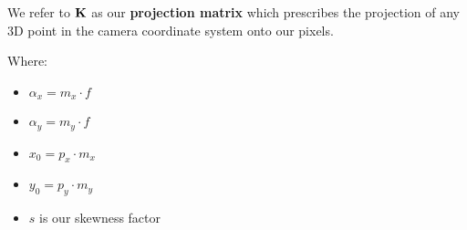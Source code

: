 \documentclass{beamer}
\begin{document}
\begin{frame}[allowframebreaks]
We refer to $\bf K$ as our \textbf{projection matrix} which prescribes the projection of any 3D point in the camera coordinate system onto our pixels.

Where:
\begin{itemize}
  \item $\alpha_{x}= m_{x} \cdot f$
  \item $\alpha_{y} = m_{y} \cdot f$
  \item $x_{0} = p_{x} \cdot m_{x}$
  \item $y_{0} = p_{y} \cdot m_{y}$
  \item $s$ is our skewness factor
\end{itemize}



  \end{frame}
\end{document}
